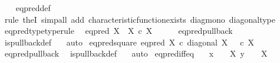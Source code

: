 \begin{isabellebody}
%
\isadelimproof
\ \ %
\endisadelimproof
%
\isatagproof
{}\isamarkupfalse%
\ eq{\isacharunderscore}{\kern0pt}pred{\isacharunderscore}{\kern0pt}def\isanewline
\ \ \isamarkupfalse%
\ {\isacharparenleft}{\kern0pt}rule\ the{}I{}{\isacharcomma}{\kern0pt}\ simp{\isacharunderscore}{\kern0pt}all\ add{\isacharcolon}{\kern0pt}\ characteristic{\isacharunderscore}{\kern0pt}function{\isacharunderscore}{\kern0pt}exists\ diag{\isacharunderscore}{\kern0pt}mono\ diagonal{\isacharunderscore}{\kern0pt}type{\isacharparenright}{\kern0pt}%
\endisatagproof
{\isafoldproof}%
%
\isadelimproof
\isanewline
%
\endisadelimproof
\isanewline
{}\isamarkupfalse%
\ eq{\isacharunderscore}{\kern0pt}pred{\isacharunderscore}{\kern0pt}type{\isacharbrackleft}{\kern0pt}type{\isacharunderscore}{\kern0pt}rule{\isacharbrackright}{\kern0pt}{\isacharcolon}{\kern0pt}\isanewline
\ \ {\isachardoublequoteopen}eq{\isacharunderscore}{\kern0pt}pred\ X\ {\isacharcolon}{\kern0pt}\ X\ {\isasymtimes}\isactrlsub c\ X\ {\isasymrightarrow}\ {\isasymOmega}{\isachardoublequoteclose}\isanewline
%
\isadelimproof
\ \ %
\endisadelimproof
%
\isatagproof
{}\isamarkupfalse%
\ eq{\isacharunderscore}{\kern0pt}pred{\isacharunderscore}{\kern0pt}pullback\ \isamarkupfalse%
\ is{\isacharunderscore}{\kern0pt}pullback{\isacharunderscore}{\kern0pt}def\ \ \isamarkupfalse%
\ auto%
\endisatagproof
{\isafoldproof}%
%
\isadelimproof
\isanewline
%
\endisadelimproof
\isanewline
{}\isamarkupfalse%
\ eq{\isacharunderscore}{\kern0pt}pred{\isacharunderscore}{\kern0pt}square{\isacharcolon}{\kern0pt}\ {\isachardoublequoteopen}eq{\isacharunderscore}{\kern0pt}pred\ X\ {\isasymcirc}\isactrlsub c\ diagonal\ X\ {\isacharequal}{\kern0pt}\ {\isasymt}\ {\isasymcirc}\isactrlsub c\ {\isasymbeta}\isactrlbsub X\isactrlesub {\isachardoublequoteclose}\isanewline
%
\isadelimproof
\ \ %
\endisadelimproof
%
\isatagproof
{}\isamarkupfalse%
\ eq{\isacharunderscore}{\kern0pt}pred{\isacharunderscore}{\kern0pt}pullback\ \isamarkupfalse%
\ is{\isacharunderscore}{\kern0pt}pullback{\isacharunderscore}{\kern0pt}def\ \ \isamarkupfalse%
\ auto%
\endisatagproof
{\isafoldproof}%
%
\isadelimproof
\isanewline
%
\endisadelimproof
\isanewline
{}\isamarkupfalse%
\ eq{\isacharunderscore}{\kern0pt}pred{\isacharunderscore}{\kern0pt}iff{\isacharunderscore}{\kern0pt}eq{\isacharcolon}{\kern0pt}\isanewline
\ \ \ {\isachardoublequoteopen}x\ {\isacharcolon}{\kern0pt}\ {\isasymone}\ {\isasymrightarrow}\ X{\isachardoublequoteclose}\ {\isachardoublequoteopen}y\ {\isacharcolon}{\kern0pt}\ {\isasymone}\ {\isasymrightarrow}\ X{\isachardoublequoteclose}\isanewline

\end{isabellebody}
